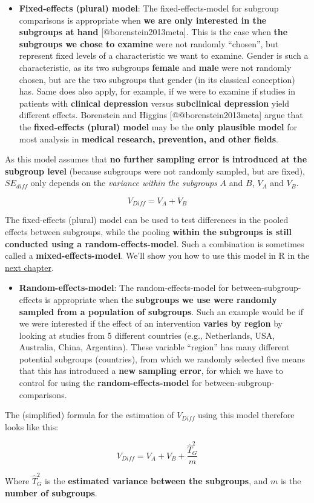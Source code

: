 \documentclass[]{book}
\providecommand{\tightlist}{%
  \setlength{\itemsep}{0pt}\setlength{\parskip}{0pt}}
\begin{document}
\begin{rmdinfo}
\begin{itemize}
\tightlist
\item
  \textbf{Fixed-effects (plural) model}: The fixed-effects-model for
  subgroup comparisons is appropriate when \textbf{we are only
  interested in the subgroups at hand} {[}@borenstein2013meta{]}. This
  is the case when \textbf{the subgroups we chose to examine} were not
  randomly ``chosen'', but represent fixed levels of a characteristic we
  want to examine. Gender is such a characteristic, as its two subgroups
  \textbf{female} and \textbf{male} were not randomly chosen, but are
  the two subgroups that gender (in its classical conception) has. Same
  does also apply, for example, if we were to examine if studies in
  patients with \textbf{clinical depression} versus \textbf{subclinical
  depression} yield different effects. Borenstein and Higgins
  {[}@@borenstein2013meta{]} argue that the \textbf{fixed-effects
  (plural) model} may be the \textbf{only plausible model} for most
  analysis in \textbf{medical research, prevention, and other fields}.
\end{itemize}

As this model assumes that \textbf{no further sampling error is
introduced at the subgroup level} (because subgroups were not randomly
sampled, but are fixed), \(SE_{diff}\) only depends on the
\emph{variance within the subgroups} \(A\) and \(B\), \(V_A\) and
\(V_B\).

\[V_{Diff}=V_A + V_B\]

The fixed-effects (plural) model can be used to test differences in the
pooled effects between subgroups, while the pooling \textbf{within the
subgroups is still conducted using a random-effects-model}. Such a
combination is sometimes called a \textbf{mixed-effects-model}. We'll
show you how to use this model in R in the
\protect\hyperlink{mixed}{next chapter}.

\begin{itemize}
\tightlist
\item
  \textbf{Random-effects-model}: The random-effects-model for
  between-subgroup-effects is appropriate when the \textbf{subgroups we
  use were randomly sampled from a population of subgroups}. Such an
  example would be if we were interested if the effect of an
  intervention \textbf{varies by region} by looking at studies from 5
  different countries (e.g., Netherlands, USA, Australia, China,
  Argentina). These variable ``region'' has many different potential
  subgroups (countries), from which we randomly selected five means that
  this has introduced a \textbf{new sampling error}, for which we have
  to control for using the \textbf{random-effects-model} for
  between-subgroup-comparisons.
\end{itemize}

The (simplified) formula for the estimation of \(V_{Diff}\) using this
model therefore looks like this:

\[V_{Diff}=V_A + V_B + \frac{\hat T^2_G}{m} \]

Where \(\hat T^2_G\) is the \textbf{estimated variance between the
subgroups}, and \(m\) is the \textbf{number of subgroups}.
\end{rmdinfo}
\end{document}
